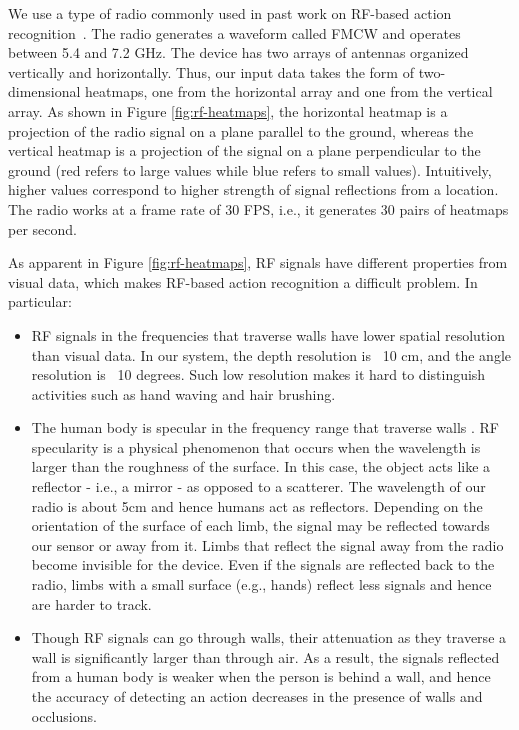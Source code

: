 \documentclass[10pt,twocolumn,letterpaper]{article}
\newenvironment{Itemize}{\begin{itemize}\setlength{\itemsep}{0pt}\setlength{\topsep}{0pt}\setlength{\partopsep}{0pt}\setlength{\parskip}{0pt}}{\end{itemize}}
\begin{document}
We use a type of radio commonly used in past work on RF-based action recognition~\cite{zhao2018rf, lien2016soli, zhang2018latern, chetty2017low, peng2016fmcw, tian2018rf, hsu2019enabling, zhao2016emotion, zhao2017learning, zhao2019through}.  The radio generates a waveform called FMCW 
and operates between 5.4 and 7.2 GHz. The device has two arrays of antennas organized vertically and horizontally.
Thus, our input data takes the form of two-dimensional heatmaps, one from the horizontal array and one from the vertical array. As shown in Figure \ref{fig:rf-heatmaps}, the horizontal heatmap is a projection of the  radio signal on a plane parallel to the ground, whereas the vertical heatmap is a projection of the signal on a plane perpendicular to the ground (red refers to large values while blue refers to small values). Intuitively, higher values correspond to higher strength of signal reflections from a location. The radio works at a frame rate of 30 FPS, i.e., it generates 30 pairs of heatmaps per second. 

As apparent in Figure \ref{fig:rf-heatmaps}, RF signals have different properties from visual data, which makes RF-based action recognition a difficult problem. In particular:
\begin{Itemize}
	\item RF signals in the frequencies that traverse walls have  lower spatial resolution than visual data. In our system, the depth resolution is ~10 cm, and the angle resolution is ~10 degrees. Such low resolution makes it hard to distinguish activities such as hand waving and hair brushing.
	\item The human body is specular in the frequency range that traverse walls \cite{beckmann1987scattering}. RF specularity is a physical phenomenon that occurs when the wavelength is larger than the roughness of the surface. In this case, the object acts like a reflector - i.e., a mirror - as opposed to a scatterer. The wavelength of our radio is about 5cm and hence humans act as reflectors. Depending on the orientation of the surface of each limb, the signal may be reflected towards our sensor or away from it. Limbs that reflect the signal away from the radio become invisible for the device. Even if the signals are reflected back to the radio, limbs with a small surface (e.g., hands) reflect less signals and hence are harder to track. 
	\item Though RF signals can go through walls, their attenuation as they traverse a wall is significantly larger than through air. As a result, the signals reflected from a human body is weaker when the person is behind a wall, and hence the accuracy of detecting an action decreases in the presence of walls and occlusions. 
\end{Itemize}
\end{document}
